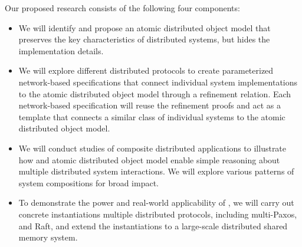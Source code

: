 Our proposed research consists of the following four components:
\begin{itemize}%
\item We will identify and propose an atomic distributed object model
  that preserves the key characteristics of distributed systems, but
  hides the implementation details.
\item We will explore different distributed protocols to create
  parameterized network-based specifications that connect individual
  system implementations to the atomic distributed object model
  through a refinement relation. Each network-based specification will
  reuse the refinement proofs and act as a template that connects a
  similar class of individual systems to the atomic distributed object
  model.
\item We will conduct studies of composite distributed applications to
  illustrate how \sysname{} and atomic distributed object model enable
  simple reasoning about multiple distributed system interactions. We
  will explore various patterns of system compositions for broad
  impact.
\item To demonstrate the power and real-world applicability of
  \sysname{}, we will carry out concrete instantiations multiple
  distributed protocols, including multi-Paxos, and Raft, and extend
  the instantiations to a large-scale distributed shared memory
  system.
\end{itemize}
